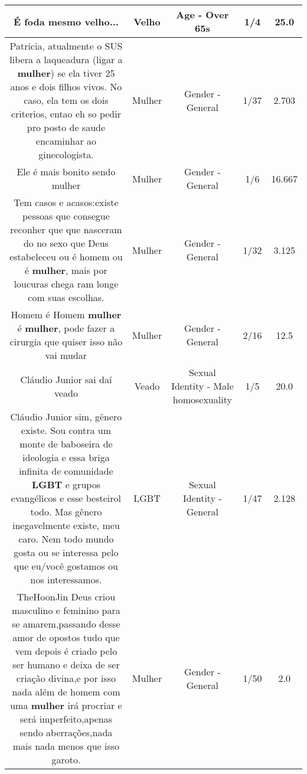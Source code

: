 \documentclass[11pt]{article}
\newlength\mylength
\begin{document}
\begin{center}
\begin{longtable}{|C{.65\mylength}|C{.30\mylength}|C{.12\mylength}|C{.12\mylength}|C{.12\mylength}|}
  \small É foda mesmo \textbf{velho}...\normalsize   & Velho & Age - Over 65s & 1/4 & 25.0 \\  \hline
  \small Patricia, atualmente o SUS libera a laqueadura (ligar a \textbf{mulher}) se ela tiver 25 anos e dois filhos vivos. No caso, ela tem os dois criterios, entao eh so pedir pro posto de saude encaminhar ao ginecologista.\normalsize   & Mulher & Gender - General & 1/37 & 2.703 \\  \hline
  \small Ele é mais bonito sendo mulher\normalsize   & Mulher & Gender - General & 1/6 & 16.667 \\  \hline
  \small Tem casos e acasos:existe pessoas que consegue reconher que que nasceram do no sexo que Deus estabeleceu ou é homem ou é \textbf{mulher}, mais por loucuras chega ram longe com suas escolhas.\normalsize   & Mulher & Gender - General & 1/32 & 3.125 \\  \hline
  \small Homem é Homem \textbf{mulher} é \textbf{mulher}, pode fazer a cirurgia que quiser isso não vai mudar\normalsize   & Mulher & Gender - General & 2/16 & 12.5 \\  \hline
  \small Cláudio Junior sai daí veado\normalsize   & Veado & Sexual Identity - Male homosexuality & 1/5 & 20.0 \\  \hline
  \small Cláudio Junior sim, gênero existe. Sou contra um monte de baboseira de ideologia e essa briga infinita de comunidade \textbf{LGBT} e grupos evangélicos e esse besteirol todo. Mas gênero inegavelmente existe, meu caro. Nem todo mundo gosta ou se interessa pelo que eu/você gostamos ou nos interessamos.\normalsize   & LGBT & Sexual Identity - General & 1/47 & 2.128 \\  \hline
  \small TheHoonJin Deus criou masculino e feminino para se amarem,passando desse amor de opostos tudo que vem depois é criado pelo ser humano e deixa de ser criação divina,e por isso nada além de homem com uma \textbf{mulher} irá procriar e será imperfeito,apenas sendo aberrações,nada mais nada menos que isso garoto.\normalsize   & Mulher & Gender - General & 1/50 & 2.0 \\  \hline

\end{longtable}
\end{center}
\end{document}
